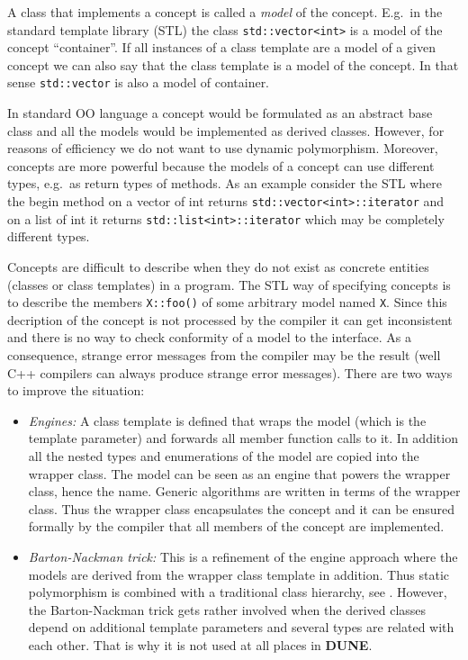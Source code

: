 \documentclass[11pt,a4paper,headinclude,footinclude,DIV16,normalheadings]{scrreprt}
\newcommand{\Dune}{{\sf\bfseries DUNE}\xspace}
\begin{document}
A class that implements a concept is called a
\textit{model} of the concept. E.g.~in the standard template library (STL)
the class \lstinline!std::vector<int>! is a model of the concept
``container''. If all instances of a class template are a model of
a given concept we can also say that the class template is a model of
the concept. In that sense \lstinline!std::vector! is also a model of
container.  

In standard OO language a concept would be formulated as
an abstract base class and all the models would be implemented as
derived classes. However, for reasons of efficiency we do not want to
use dynamic polymorphism. Moreover, concepts are more powerful because
the models of a concept can use different types, e.g.~as return types of
methods. As an example consider the STL where the begin method on a
vector of int returns \lstinline!std::vector<int>::iterator! and on a
list of int it returns \lstinline!std::list<int>::iterator! which may
be completely different types. 

Concepts are difficult to describe when they do not exist as concrete
entities (classes or class templates) in a program. The STL way of
specifying concepts is to describe the members \lstinline!X::foo()! of
some arbitrary model named \lstinline!X!. Since this decription of the
concept is not processed by the compiler it can get inconsistent and
there is no way to check conformity of a model to the interface. As a
consequence, strange error messages from the compiler may be the
result (well C++ compilers can always produce strange error messages).
There are two ways to improve the situation:
\begin{itemize}
\item \textit{Engines:} A class template is defined that wraps the
  model (which is the template parameter) and forwards all member
  function calls to it. In addition all the nested types and
  enumerations of the model are copied into the wrapper class. 
  The model can be seen as an engine that powers the wrapper class,
  hence the name. Generic
  algorithms are written in terms of the wrapper class. Thus the
  wrapper class encapsulates the concept and it can be ensured
  formally by the compiler that
  all members of the concept are implemented.

\item \textit{Barton-Nackman trick:} This is a refinement of the
  engine approach where the models are derived from the wrapper class
  template in addition. Thus static polymorphism is combined
  with a traditional class hierarchy, see \cite{Veldhui99,BN}. 
  However, the
  Barton-Nackman trick gets rather involved when the derived classes
  depend on additional template parameters and several types are related
  with each other. That is why it is not used at all places in \Dune.
\end{itemize}
\end{document}
